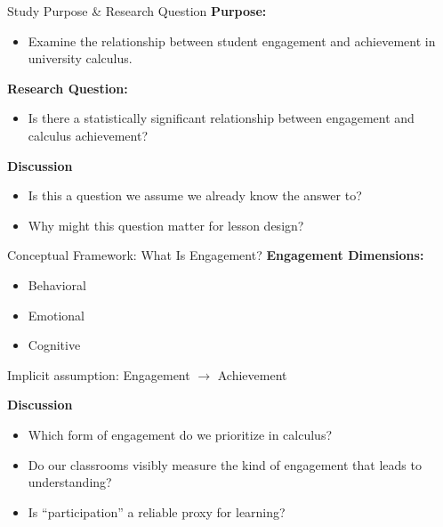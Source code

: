 \documentclass{beamer}
\begin{document}
\begin{frame}{Study Purpose \& Research Question}
\textbf{Purpose:}
\begin{itemize}
    \item Examine the relationship between student engagement and achievement in university calculus.
\end{itemize}

\bigskip

\textbf{Research Question:}
\begin{itemize}
    \item Is there a statistically significant relationship between engagement and calculus achievement?
\end{itemize}

\bigskip

\textbf{Discussion}
\begin{itemize}
    \item Is this a question we assume we already know the answer to?
    \item Why might this question matter for lesson design?
\end{itemize}
\end{frame}

\begin{frame}{Conceptual Framework: What Is Engagement?}
\textbf{Engagement Dimensions:}
\begin{itemize}
    \item Behavioral
    \item Emotional
    \item Cognitive
\end{itemize}

\bigskip

Implicit assumption: Engagement $\rightarrow$ Achievement

\bigskip

\textbf{Discussion}
\begin{itemize}
    \item Which form of engagement do we prioritize in calculus?
    \item Do our classrooms visibly measure the kind of engagement that leads to understanding?
    \item Is “participation” a reliable proxy for learning?
\end{itemize}
\end{frame}

\end{document}
